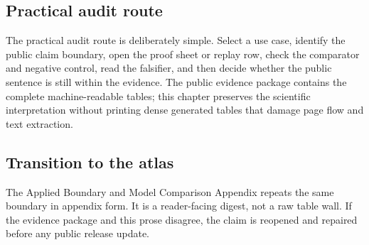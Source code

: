 \subsection{Practical audit route}

The practical audit route is deliberately simple. Select a use case, identify the public claim boundary, open the proof sheet or replay row, check the comparator and negative control, read the falsifier, and then decide whether the public sentence is still within the evidence. The public evidence package contains the complete machine-readable tables; this chapter preserves the scientific interpretation without printing dense generated tables that damage page flow and text extraction.


\subsection{Transition to the atlas}

The Applied Boundary and Model Comparison Appendix repeats the same boundary in appendix form. It is a reader-facing digest, not a raw table wall. If the evidence package and this prose disagree, the claim is reopened and repaired before any public release update.

